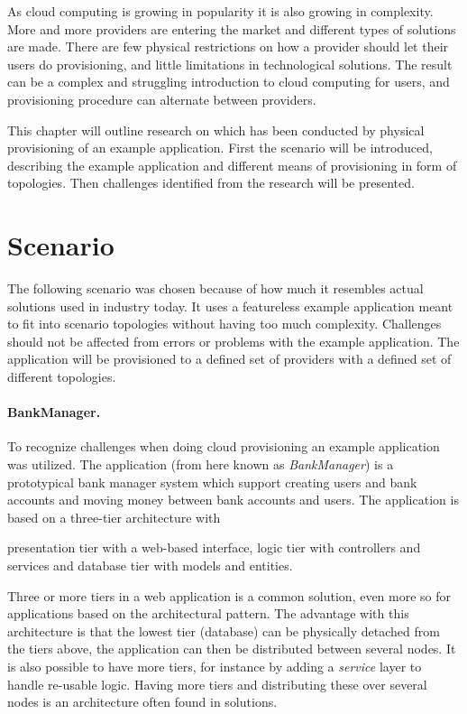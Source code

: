 
As cloud computing is growing in popularity it is also growing in complexity.
More and more providers are entering the market and different types of solutions are made.
There are few physical restrictions on how a provider should let their users do provisioning,
and little limitations in technological solutions.  
The result can be a complex and struggling introduction to cloud computing for users,
and provisioning procedure can alternate between providers.

This chapter will outline research on which has been conducted by
physical provisioning of an example application.
First the scenario will be introduced, describing the example application
and different means of provisioning in form of topologies.
Then challenges identified from the research will be presented.

\section{Scenario}

The following scenario was chosen because of how much it resembles actual solutions
used in industry today.
It uses a featureless example application meant to fit into scenario topologies
without having too much complexity.
Challenges should not be affected from errors or problems with the example application.
The application will be provisioned to a defined set of providers with a defined set of different topologies.

\paragraph{BankManager.}

To recognize challenges when doing cloud provisioning an example application~\cite{BankManager} was utilized.
The application (from here known as \emph{BankManager}) is a prototypical bank manager system
which support creating users and bank accounts and moving money between bank accounts and users.
The application is based on a three-tier architecture with 
\begin{ii} 
  \iitem presentation tier with a web-based interface,
  \iitem logic tier with controllers and services and
  \iitem database tier with models and entities.
\end{ii}
Three or more tiers in a web application is a common solution, even more so for applications 
based on the  architectural pattern.
The advantage with this architecture is that the lowest tier (database) can be physically
detached from the tiers above, the application can then be distributed between several nodes.
It is also possible to have more tiers, for instance by adding a \emph{service} 
layer to handle re-usable logic.
Having more tiers and distributing these over several nodes is an architecture often
found in  solutions.

